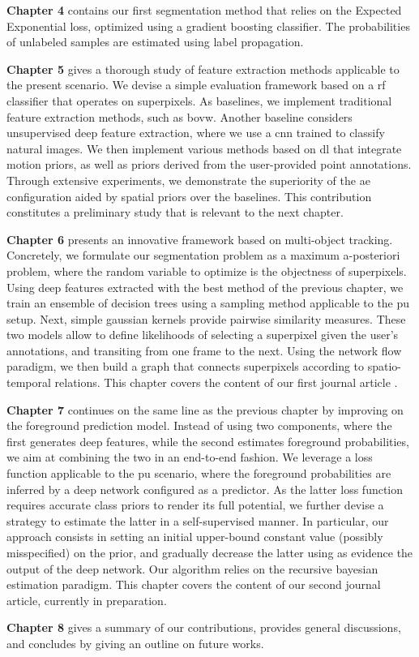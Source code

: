 \textbf{Chapter 4} contains our first segmentation method that relies on the Expected Exponential loss, optimized using a gradient boosting classifier. The probabilities of unlabeled samples are estimated using label propagation.

\textbf{Chapter 5} gives a thorough study of feature extraction methods applicable to the present scenario.
We devise a simple evaluation framework based on a \gls{rf} classifier that operates on superpixels.
As baselines, we implement traditional feature extraction methods, such as \gls{bovw}.
Another baseline considers unsupervised deep feature extraction, where we use a \gls{cnn} trained to classify natural images.
We then implement various methods based on \gls{dl} that integrate motion priors, as well as priors derived from the user-provided point annotations.
Through extensive experiments, we demonstrate the superiority of the \gls{ae} configuration aided by spatial priors over the baselines.
This contribution constitutes a preliminary study that is relevant to the next chapter.

\textbf{Chapter 6} presents an innovative framework based on multi-object tracking.
Concretely, we formulate our segmentation problem as a maximum a-posteriori problem, where the random variable to optimize is the objectness of superpixels.
Using deep features extracted with the best method of the previous chapter, we train an ensemble of decision trees using a sampling method applicable to the \gls{pu} setup.
Next, simple gaussian kernels provide pairwise similarity measures.
These two models allow to define likelihoods of selecting a superpixel given the user's annotations, and transiting from one frame to the next.
Using the network flow paradigm, we then build a graph that connects superpixels according to spatio-temporal relations.
This chapter covers the content of our first journal article \cite{lejeune18}.

\textbf{Chapter 7} continues on the same line as the previous chapter by improving on the foreground prediction model.
Instead of using two components, where the first generates deep features, while the second estimates foreground probabilities, we aim at combining the two in an end-to-end fashion.
We leverage a loss function applicable to the \gls{pu} scenario, where the foreground probabilities are inferred by a deep network configured as a predictor.
As the latter loss function requires accurate class priors to render its full potential, we further devise a strategy to estimate the latter in a self-supervised manner.
In particular, our approach consists in setting an initial upper-bound constant value (possibly misspecified) on the prior, and gradually decrease the latter using as evidence the output of the deep network.
Our algorithm relies on the recursive bayesian estimation paradigm.
This chapter covers the content of our second journal article, currently in preparation.

\textbf{Chapter 8} gives a summary of our contributions, provides general discussions, and concludes by giving an outline on future works.

